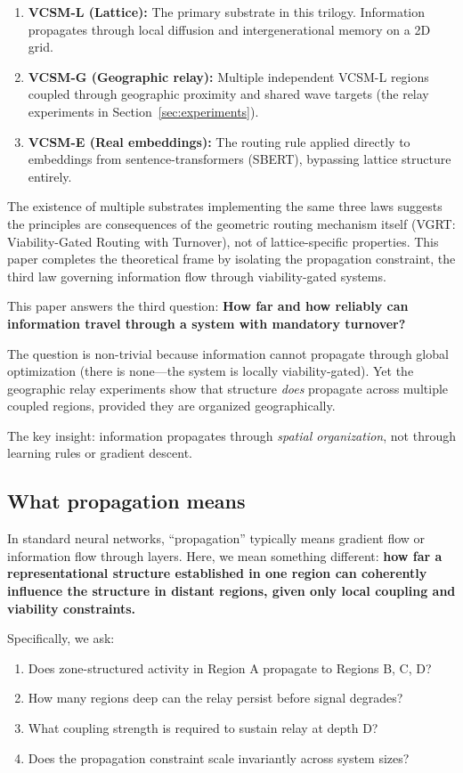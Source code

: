 \documentclass[11pt]{article}
\begin{document}
\begin{enumerate}
  \item \textbf{VCSM-L (Lattice):} The primary substrate in this trilogy. Information propagates through local diffusion and intergenerational memory on a 2D grid.
  \item \textbf{VCSM-G (Geographic relay):} Multiple independent VCSM-L regions coupled through geographic proximity and shared wave targets (the relay experiments in Section~\ref{sec:experiments}).
  \item \textbf{VCSM-E (Real embeddings):} The routing rule applied directly to embeddings from sentence-transformers (SBERT), bypassing lattice structure entirely.
\end{enumerate}

The existence of multiple substrates implementing the same three laws suggests the principles are consequences of the geometric routing mechanism itself (VGRT: Viability-Gated Routing with Turnover), not of lattice-specific properties. This paper completes the theoretical frame by isolating the propagation constraint, the third law governing information flow through viability-gated systems.

This paper answers the third question: \textbf{How far and how reliably can information travel through a system with mandatory turnover?}

The question is non-trivial because information cannot propagate through global optimization (there is none---the system is locally viability-gated). Yet the geographic relay experiments show that structure \emph{does} propagate across multiple coupled regions, provided they are organized geographically.

The key insight: information propagates through \emph{spatial organization}, not through learning rules or gradient descent.

\subsection{What propagation means}

In standard neural networks, ``propagation'' typically means gradient flow or information flow through layers. Here, we mean something different: \textbf{how far a representational structure established in one region can coherently influence the structure in distant regions, given only local coupling and viability constraints.}

Specifically, we ask:
\begin{enumerate}
  \item Does zone-structured activity in Region A propagate to Regions B, C, D?
  \item How many regions deep can the relay persist before signal degrades?
  \item What coupling strength is required to sustain relay at depth D?
  \item Does the propagation constraint scale invariantly across system sizes?
\end{enumerate}
\end{document}
